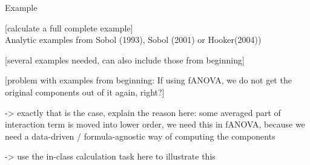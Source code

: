 \documentclass[11pt,compress,t,notes=noshow, aspectratio=169, xcolor=table]{beamer}
\begin{document}
\begin{frame}{Example}

    [calculate a full complete example] \\

    Analytic examples from Sobol (1993), Sobol (2001) or Hooker(2004))

    [several examples needed, can also include those from beginning]
    
    [problem with examples from beginning: If using fANOVA, we do not get the original components out of it again, right?]

    -> exactly that is the case, explain the reason here: some averaged part of interaction term is moved into lower order, we need this in fANOVA, because we need a data-driven / formula-agnostic way of computing the components

    -> use the in-class calculation task here to illustrate this
    
\end{frame}
\end{document}
